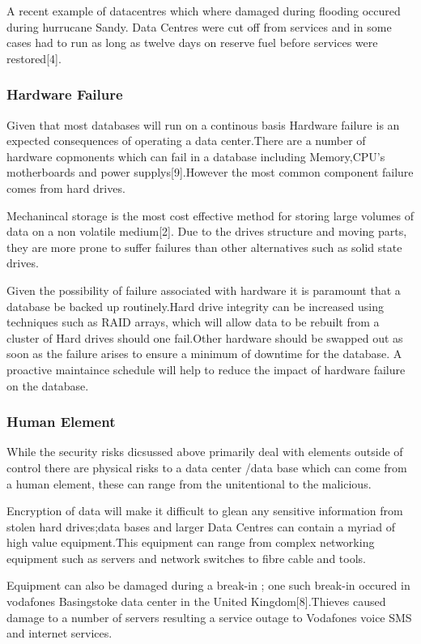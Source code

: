 \documentclass[11pt]{article}
\begin{document}
A recent example of datacentres which where damaged during flooding occured during hurrucane Sandy. Data Centres were cut off from services and in some cases had to run as long as twelve days on reserve fuel before services were restored[4].



\subsubsection{Hardware Failure}
Given that most databases will run on a continous basis Hardware failure is an expected consequences of operating a data center.There are a number of hardware copmonents which can fail in a database including Memory,CPU's motherboards and power supplys[9].However the most common component failure comes from hard drives.

Mechanincal storage is the most cost effective method for storing large volumes of data on a non volatile medium[2]. Due to the drives structure and moving parts, they are more prone to suffer failures than other alternatives such as  solid state drives.

Given the possibility of failure associated with hardware it is paramount that a database be backed up routinely.Hard drive integrity can be increased using techniques such as RAID arrays, which will allow data to be rebuilt from a cluster of Hard drives should one fail.Other hardware should be swapped out as soon as the failure arises to ensure a minimum of downtime for the database. A proactive maintaince schedule will help to reduce the impact of hardware failure on the database.

\subsubsection{Human Element}
While the security risks dicsussed above primarily deal with elements outside of control there are physical risks to a data center /data base which can come from a human element, these can range from the unitentional to the malicious.

Encryption of data will make it  difficult to glean any sensitive information from stolen hard drives;data bases and larger Data Centres can contain a myriad of high value equipment.This equipment can range from complex networking equipment such as servers and network switches to fibre cable and tools.

Equipment can also be damaged during a break-in ; one such break-in occured in vodafones Basingstoke data center in the United Kingdom[8].Thieves caused damage to a number of servers resulting a service outage to Vodafones voice SMS and internet services.
\end{document}

